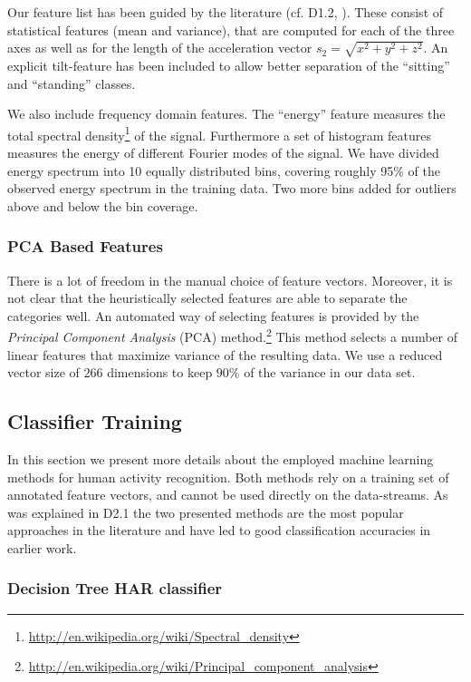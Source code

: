Our feature list has been guided by the literature (cf. D1.2,
\cite{lara12}).  These consist of statistical features (mean and
variance), that are computed for each of the three axes as well as for
the length of the acceleration vector $s_2 = \sqrt{x^2 + y^2 + z^2}$.
An explicit tilt-feature has been included to allow better separation
of the ``sitting'' and ``standing'' classes.

We also include frequency domain features.  The ``energy'' feature
measures the total spectral
density\footnote{\url{http://en.wikipedia.org/wiki/Spectral_density}}
of the signal. Furthermore a set of histogram features measures the
energy of different Fourier modes of the signal. We have divided
energy spectrum into 10 equally distributed bins, covering roughly
95\% of the observed energy spectrum in the training data. Two more
bins added for outliers above and below the bin coverage.

\subsubsection*{\bf PCA Based Features}

There is a lot of freedom in the manual choice of feature vectors.
Moreover, it is not clear that the heuristically selected features
are able to separate the categories well. An automated way of
selecting features is provided by the {\it Principal Component
  Analysis} (PCA) method.\footnote{\url{http://en.wikipedia.org/wiki/Principal_component_analysis}}
This method selects a number of linear features that maximize 
variance of the resulting data. We use a reduced vector size of $266$
dimensions to keep $90\%$ of the variance in our data set.

\subsection{Classifier Training}\label{sec:har_classifier_training}

In this section we present more details about the employed machine
learning methods for human activity recognition. Both methods rely on
a training set of annotated feature vectors, and cannot be used
directly on the data-streams. As was explained in D2.1 the two
presented methods are the most popular approaches in the literature
and have led to good classification accuracies in earlier work.

\subsubsection*{{\bf Decision Tree HAR classifier}}
\label{sec:DectionTree}

